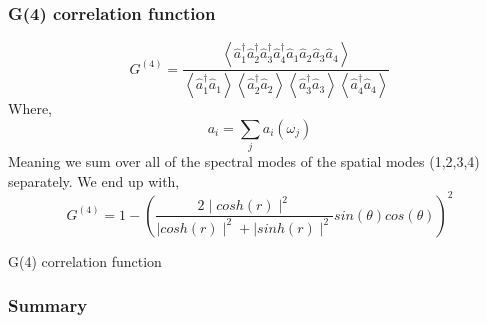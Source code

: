 \documentclass{beamer}
\renewcommand{\annia}{\hat{a}}
\renewcommand{\creata}{\hat{a}^\dagger}
\begin{document}
\begin{frame}
    \frametitle{G(4) correlation function}
    \begin{equation}
        G^{(4)} = \frac{ \left< \creata_1 \creata_2 \creata_3 \creata_4 \annia_1 \annia_2 \annia_3 \annia_4 \right>}
        {\left< \creata_1 \annia_1 \right> \left< \creata_2 \annia_2 \right> \left< \creata_3 \annia_3 \right> \left< \creata_4 \annia_4 \right>}
    \end{equation}
    Where,
    \begin{equation}
        a_i = \sum_j a_{i}(\omega_j)
    \end{equation}
    Meaning we sum over all of the spectral modes of the spatial modes (1,2,3,4) separately.
    We end up with, 
    \begin{equation}
        G^{(4)} = 1 - \left( \frac{2 \mid cosh(r) \mid^2}{\mid cosh(r) \mid ^2 + \mid sinh(r) \mid^2} sin(\theta) cos(\theta) \right)^2
    \end{equation}
\end{frame}

\begin{frame}{G(4) correlation function}

    \begin{figure}[h]
    \end{figure}
\end{frame}

\begin{frame}
\frametitle{Summary}
\begin{itemize}
\end{itemize}
\end{frame}




\end{document}
